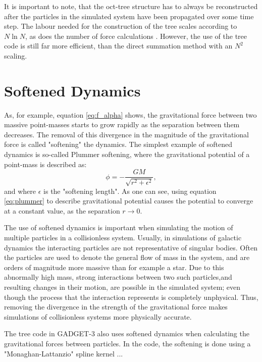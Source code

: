 \documentclass[english, oneside]{HYgradu}
\begin{document}
It is important to note, that the oct-tree structure has to always be reconstructed after the particles in the simulated system have been propagated over some time step. The labour needed for the construction of the tree scales according to $N \ln N$, as does the number of force calculations \citep{BinneyTremaine}. However, the use of the tree code is still far more efficient, than the direct summation method with an $N^2$ scaling.

\section{Softened Dynamics} \label{section:softened_dynamics}

As, for example, equation \ref{eq:f_alpha} shows, the gravitational force between two massive point-masses starts to grow rapidly as the separation between them decreases. The removal of this divergence in the magnitude of the gravitational force is called "softening" the dynamics. The simplest example of softened dynamics is so-called Plummer softening, where the gravitational potential of a point-mass is described as:
\begin{equation}
\phi = -\frac{GM}{\sqrt{r^2 + \epsilon^2}}, \label{eq:plummer}
\end{equation}
and where $\epsilon$ is the "softening length". As one can see, using equation \ref{eq:plummer} to describe gravitational potential causes the potential to converge at a constant value, as the separation $r \rightarrow 0$.

The use of softened dynamics is important when simulating the motion of multiple particles in a collisionless system. Usually, in simulations of galactic dynamics the interacting particles are not representative of singular bodies. Often the particles are used to denote the general flow of mass in the system, and are orders of magnitude more massive than for example a star. Due to this abnormally high mass, strong interactions between two such particles,and resulting changes in their motion, are possible in the simulated system; even though the process that the interaction represents is completely unphysical. Thus, removing the divergence in the strength of the gravitational force makes simulations of collisionless systems more physically accurate.

The tree code in GADGET-3 also uses softened dynamics when calculating the gravitational forces between particles. In the code, the softening is done using a "Monaghan-Lattanzio" spline kernel \citep{Monaghan1985}...
\end{document}
